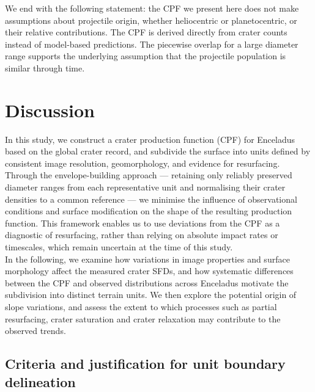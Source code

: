 \documentclass[preprint,11pt,3p,times,authoryear]{elsarticle}
\begin{document}
We end with the following statement: the CPF we present here does not make assumptions about projectile origin, whether heliocentric or planetocentric, or their relative contributions. The CPF is derived directly from crater counts instead of model-based predictions. The piecewise overlap for a large diameter range supports the underlying assumption that the projectile population is similar through time.


\section{Discussion}
\label{sec:discussion}
In this study, we construct a crater production function (CPF) for Enceladus based on the global crater record, and subdivide the surface into units defined by consistent image resolution, geomorphology, and evidence for resurfacing.
Through the envelope-building approach — retaining only reliably preserved diameter ranges from each representative unit and normalising their crater densities to a common reference — we minimise the influence of observational conditions and surface modification on the shape of the resulting production function.
This framework enables us to use deviations from the CPF as a diagnostic of resurfacing, rather than relying on absolute impact rates or timescales, which remain uncertain at the time of this study.\\

In the following, we examine how variations in image properties and surface morphology affect the measured crater SFDs, and how systematic differences between the CPF and observed distributions across Enceladus motivate the subdivision into distinct terrain units. We then explore the potential origin of slope variations, and assess the extent to which processes such as partial resurfacing, crater saturation and crater relaxation may contribute to the observed trends. 

\subsection{Criteria and justification for unit boundary delineation}
\end{document}
